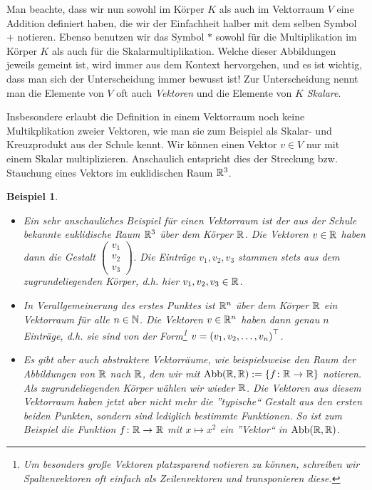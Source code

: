 \documentclass[ngerman, a4paper, 12pt]{scrreprt}
\newcounter{themcount}
\theoremstyle{plain}
\newtheorem{beispiel}[themcount]{Beispiel}
\theoremstyle{proofstyle}
\begin{document}
	Man beachte, dass wir nun sowohl im Körper $K$ als auch im Vektorraum $V$ eine Addition definiert haben, die wir der Einfachheit halber mit dem selben Symbol $+$ notieren. Ebenso benutzen wir das Symbol $*$ sowohl für die Multiplikation im Körper $K$ als auch für die Skalarmultiplikation. Welche dieser Abbildungen jeweils gemeint ist, wird immer aus dem Kontext hervorgehen, und es ist wichtig, dass man sich der Unterscheidung immer bewusst ist! Zur Unterscheidung nennt man die Elemente von $V$ oft auch \textit{Vektoren} und die Elemente von $K$ \textit{Skalare}. 

	Insbesondere erlaubt die Definition in einem Vektorraum noch keine Multikplikation zweier Vektoren, wie man sie zum Beispiel als Skalar- und Kreuzprodukt aus der Schule kennt. Wir können einen Vektor $v \in V$ nur mit einem Skalar multiplizieren. Anschaulich entspricht dies der Streckung bzw. Stauchung eines Vektors im euklidischen Raum $\mathbb{R}^3$.
	
	\begin{beispiel}
		\begin{itemize}
			\item Ein sehr anschauliches Beispiel für einen Vektorraum ist der aus der Schule bekannte euklidische Raum $\mathbb{R}^3$ über dem Körper $\mathbb{R}$. Die Vektoren $v \in \mathbb{R}$ haben dann die Gestalt $\left( \begin{smallmatrix} v_1 \\ v_2 \\ v_3 \end{smallmatrix} \right)$. Die Einträge $v_1, v_2, v_3$ stammen stets aus dem zugrundeliegenden Körper, d.h. hier $v_1, v_2, v_3 \in \mathbb{R}$.
			\item In Verallgemeinerung des erstes Punktes ist $\mathbb{R}^n$ über dem Körper $\mathbb{R}$ ein Vektorraum für alle $n \in \mathbb{N}$. Die Vektoren $v \in \mathbb{R}^n$ haben dann genau $n$ Einträge, d.h. sie sind von der Form\footnote{Um besonders große Vektoren platzsparend notieren zu können, schreiben wir Spaltenvektoren oft einfach als Zeilenvektoren und transponieren diese.} $v = \left( v_1, v_2, \dots, v_n \right)^{\top}$.
			\item Es gibt aber auch abstraktere Vektorräume, wie beispielsweise den Raum der Abbildungen von $\mathbb{R}$ nach $\mathbb{R}$, den wir mit $\Abb(\R,\R) \defeq \menge{\abb{f}{\R}{\R}}$ notieren. Als zugrundeliegenden Körper wählen wir wieder $\mathbb{R}$. Die Vektoren aus diesem Vektorraum haben jetzt aber nicht mehr die ''typische`` Gestalt aus den ersten beiden Punkten, sondern sind lediglich bestimmte Funktionen. So ist zum Beispiel die Funktion $\abb{f}{\R}{\R}$ mit $x \mapsto x^2$ ein ''Vektor`` in $\operatorname{Abb}(\mathbb{R},\mathbb{R})$.
		\end{itemize}
	\end{beispiel}
\end{document}
